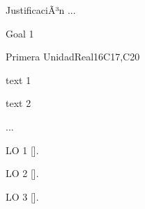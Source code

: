 \begin{syllabus}


\begin{justification}
JustificaciÃ³n ...
\end{justification}

\begin{goals}
\item Goal 1
\end{goals}

\begin{outcomes}
   \item {}
   \item {}
   \item {}
\end{outcomes}

\begin{competences}
    \item {}
    \item {}
    \item {}
\end{competences}

\begin{unit}{}{Primera Unidad}{Real}{16}{C17,C20}
\begin{topics}
      \item text 1
      \item text 2
      \item ...
\end{topics}

\begin{learningoutcomes}
   \item LO 1 [\Usage].
   \item LO 2 [\Usage].
   \item LO 3 [\Usage].
\end{learningoutcomes}
\end{unit}



\begin{coursebibliography}
\end{coursebibliography}

\end{syllabus}
